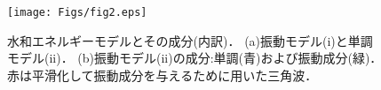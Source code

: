 \begin{figure}[h]
	\begin{center}
	\texttt{[image: Figs/fig2.eps]} 
	\end{center}
	\caption{
		水和エネルギーモデルとその成分(内訳)．
		(a)振動モデル(i)と単調モデル(ii)．
		(b)振動モデル(ii)の成分:単調(青)および振動成分(緑)．
		赤は平滑化して振動成分を与えるために用いた三角波．
	} 
	\label{fig:fig2}
\end{figure}
